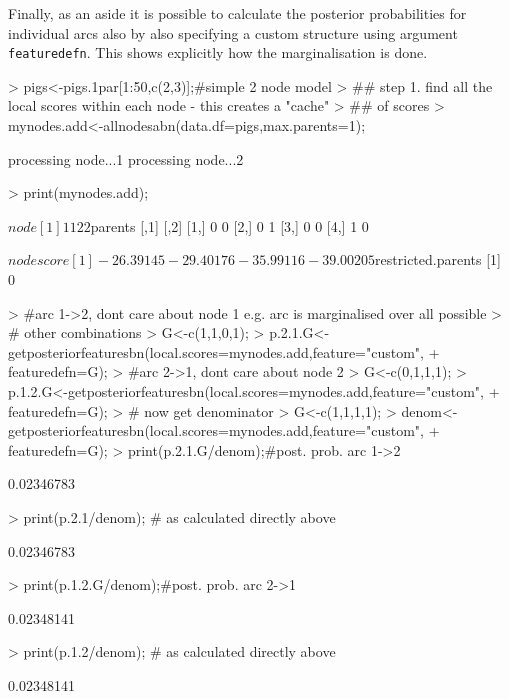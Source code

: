 \documentclass[nojss]{jss}
\begin{document}
Finally, as an aside it is possible to calculate the posterior probabilities for individual arcs also by also specifying a custom structure using argument {\tt featuredefn}. This shows explicitly how the marginalisation is done.
\begin{Schunk}
\begin{Sinput}
> pigs<-pigs.1par[1:50,c(2,3)];#simple 2 node model
> ## step 1. find all the local scores within each node - this creates a "cache"
> ##                                                                   of scores
> mynodes.add<-allnodesabn(data.df=pigs,max.parents=1); 
\end{Sinput}
\begin{Soutput}
processing node...1
processing node...2
\end{Soutput}
\begin{Sinput}
> print(mynodes.add);
\end{Sinput}
\begin{Soutput}
$node
[1] 1 1 2 2

$parents
     [,1] [,2]
[1,]    0    0
[2,]    0    1
[3,]    0    0
[4,]    1    0

$nodescore
[1] -26.39145 -29.40176 -35.99116 -39.00205

$restricted.parents
[1] 0
\end{Soutput}
\begin{Sinput}
> #arc 1->2, dont care about node 1 e.g. arc is marginalised over all possible
> #                                                         other combinations
> G<-c(1,1,0,1);
> p.2.1.G<-getposteriorfeaturesbn(local.scores=mynodes.add,feature="custom",
+                                 featuredefn=G);
> #arc 2->1, dont care about node 2
> G<-c(0,1,1,1);
> p.1.2.G<-getposteriorfeaturesbn(local.scores=mynodes.add,feature="custom",
+                                 featuredefn=G);
> # now get denominator 
> G<-c(1,1,1,1);
> denom<-getposteriorfeaturesbn(local.scores=mynodes.add,feature="custom",
+                                 featuredefn=G);
> print(p.2.1.G/denom);#post. prob. arc 1->2
\end{Sinput}
\begin{Soutput}
[1] 0.02346783
\end{Soutput}
\begin{Sinput}
> print(p.2.1/denom);  # as calculated directly above
\end{Sinput}
\begin{Soutput}
[1] 0.02346783
\end{Soutput}
\begin{Sinput}
> print(p.1.2.G/denom);#post. prob. arc 2->1
\end{Sinput}
\begin{Soutput}
[1] 0.02348141
\end{Soutput}
\begin{Sinput}
> print(p.1.2/denom);  # as calculated directly above
\end{Sinput}
\begin{Soutput}
[1] 0.02348141
\end{Soutput}
\end{Schunk}
\end{document}

